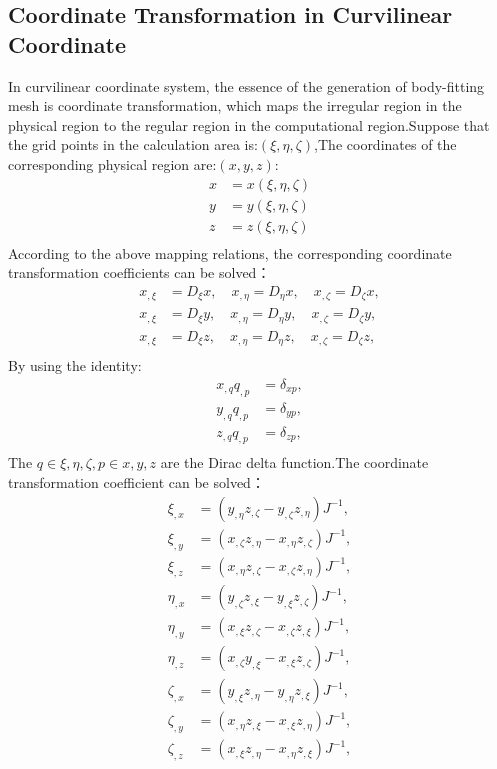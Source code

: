 \subsection{Coordinate Transformation in Curvilinear Coordinate}  
In curvilinear coordinate system, the essence of the generation of body-fitting mesh is coordinate transformation, which maps the irregular region in the physical region to the regular region in the computational region.Suppose that the grid points in the calculation area is:$ (\xi, \eta, \zeta) $,The coordinates of the corresponding physical region are:$(x, y, z)$:
\begin{align}
	x & = x(\xi, \eta, \zeta) \\
	y & = y(\xi, \eta, \zeta) \\
	z & = z(\xi, \eta, \zeta) \\
\end{align}
According to the above mapping relations, the corresponding coordinate transformation coefficients can be solved：
\begin{align}
	x_{, \xi} & = D_\xi x , \quad x_{, \eta} = D_\eta x , \quad x_{, \zeta} = D_\zeta x , \\
	x_{, \xi} & = D_\xi y , \quad x_{, \eta} = D_\eta y , \quad x_{, \zeta} = D_\zeta y , \\
	x_{, \xi} & = D_\xi z , \quad x_{, \eta} = D_\eta z , \quad x_{, \zeta} = D_\zeta z , \\
\end{align}
By using the identity:
\begin{align}
	x_{, q}q_{,p} & = \delta_{xp} , \\
	y_{, q}q_{,p} & = \delta_{yp} , \\
	z_{, q}q_{,p} & = \delta_{zp} , \\
\end{align}
The $ q \in \xi, \eta, \zeta, p \in x,y,z$ are the Dirac delta function.The coordinate transformation coefficient can be solved：
\begin{align}
	\xi_{, x} & = (y_{,\eta}z_{,\zeta} - y_{,\zeta}z_{,\eta})J^{-1} , \\
	\xi_{, y} & = (x_{,\zeta}z_{,\eta} - x_{,\eta}z_{,\zeta})J^{-1} , \\
	\xi_{, z} & = (x_{,\eta}z_{,\zeta} - x_{,\zeta}z_{,\eta})J^{-1} , \\
	\eta_{, x} & = (y_{,\zeta}z_{,\xi} - y_{,\xi}z_{,\zeta})J^{-1} , \\
	\eta_{, y} & = (x_{,\xi}z_{,\zeta} - x_{,\zeta}z_{,\xi})J^{-1} , \\
	\eta_{, z} & = (x_{,\zeta}y_{,\xi} - x_{,\xi}z_{,\zeta})J^{-1} , \\
	\zeta_{, x} & = (y_{,\xi}z_{,\eta} - y_{,\eta}z_{,\xi})J^{-1} , \\
	\zeta_{, y} & = (x_{,\eta}z_{,\xi} - x_{,\xi}z_{,\eta})J^{-1} , \\
	\zeta_{, z} & = (x_{,\xi}z_{,\eta} - x_{,\eta}z_{,\xi})J^{-1} , \\
\end{align}
